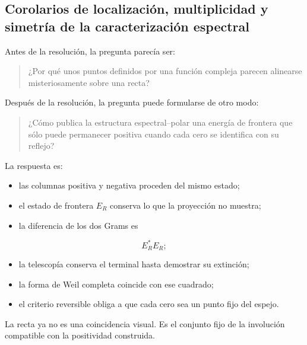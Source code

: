 \subsection{Corolarios de localización, multiplicidad y simetría de la caracterización espectral}
Antes de la resolución, la pregunta parecía ser:\par
\begin{quote}
¿Por qué unos puntos definidos por una función compleja parecen alinearse misteriosamente sobre una recta?\par
\end{quote}
Después de la resolución, la pregunta puede formularse de otro modo:\par
\begin{quote}
¿Cómo publica la estructura espectral–polar una energía de frontera que sólo puede permanecer positiva cuando cada cero se identifica con su reflejo?\par
\end{quote}
La respuesta es:\par
\begin{itemize}
\item las columnas positiva y negativa proceden del mismo estado;
\item el estado de frontera \(E_R\) conserva lo que la proyección no muestra;
\item la diferencia de los dos Grams es
\end{itemize}
\[
E_R^*E_R;
\]
\begin{itemize}
\item la telescopía conserva el terminal hasta demostrar su extinción;
\item la forma de Weil completa coincide con ese cuadrado;
\item el criterio reversible obliga a que cada cero sea un punto fijo del espejo.
\end{itemize}
La recta ya no es una coincidencia visual. Es el conjunto fijo de la involución compatible con la positividad construida.\par
{}
